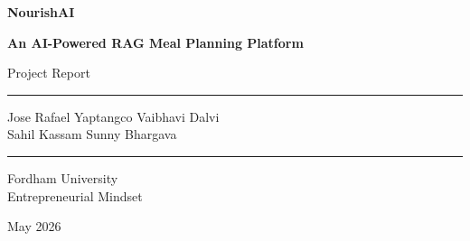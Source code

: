 \documentclass[12pt,letterpaper]{article}
\begin{document}
\begin{titlepage}
  \centering
  \vspace*{2cm}
  {\Huge\bfseries\color{accentgreen} NourishAI\par}
  \vspace{0.4cm}
  {\Large\bfseries An AI-Powered RAG Meal Planning Platform\par}
  \vspace{0.6cm}
  {\large\color{darkgray} Project Report\par}
  \vspace{2cm}

  \rule{0.5\textwidth}{0.4pt}\par
  \vspace{0.4cm}
  {\normalsize
    Jose Rafael Yaptangco \quad Vaibhavi Dalvi \\[4pt]
    Sahil Kassam \quad Sunny Bhargava
  \par}
  \vspace{0.4cm}
  \rule{0.5\textwidth}{0.4pt}\par

  \vspace{1.5cm}
  {\normalsize Fordham University\\[4pt]
  Entrepreneurial Mindset\par}

  \vspace{1cm}
  {\normalsize May 2026\par}

  \vfill
  \begin{abstract}
    \noindent
    NourishAI is a full-stack, AI-driven meal planning web application built on a
    Retrieval-Augmented Generation (RAG) architecture. The platform allows users to
    discover recipes through natural-language conversation, assemble personalized
    weekly schedules, generate consolidated grocery lists, and export meal prep guides.
    This report covers the application's purpose and technical design, the market
    context and business strategy drawn from our operations and marketing plans, and a
    rigorous empirical evaluation of the RAG retrieval pipeline across five endpoints
    using 60 LLM-judged test queries. Mean Precision@5 ranges from 0.633 to 0.783
    across endpoints, and mean Recall@20 reaches up to 0.343, demonstrating strong
    top-of-list relevance against a challenging, small-index backdrop of 697 recipes.
  \end{abstract}
\end{titlepage}
\end{document}
